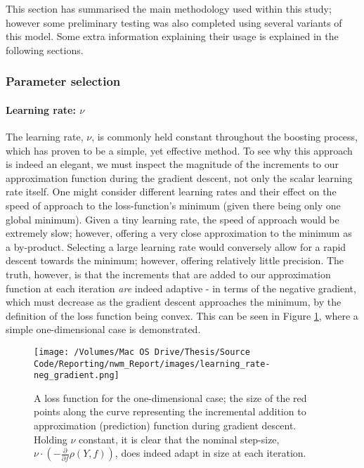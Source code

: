 \documentclass{article}
\begin{document}
This section has summarised the main methodology used within this study; however some preliminary testing was also completed using several variants of this model. Some extra information explaining their usage is explained in the following sections.


\subsubsection{Parameter selection \label{param-selection}}
\label{sec-1-4-2}


\paragraph{Learning rate: $\nu$ \label{nu}}
\label{sec-1-4-2-1}

The learning rate, $\nu$, is commonly held constant throughout the boosting process, which has proven to be a simple, yet effective method. To see why this approach is indeed an elegant, we must inspect the magnitude of the increments to our approximation function during the gradient descent, not only the scalar learning rate itself. One might consider different learning rates and their effect on the speed of approach to the loss-function's minimum (given there being only one global minimum). Given a tiny learning rate, the speed of approach would be extremely slow; however, offering a very close approximation to the minimum as a by-product. Selecting a large learning rate would conversely allow for a rapid descent towards the minimum; however, offering relatively little precision. The truth, however, is that the increments that are added to our approximation function at each iteration \emph{are} indeed adaptive - in terms of the negative gradient, which must decrease as the gradient descent approaches the minimum, by the definition of the loss function being convex. This can be seen in Figure \ref{fig:grad-descent}, where a simple one-dimensional case is demonstrated.

\begin{figure}[htb]
\centering
\texttt{[image: /Volumes/Mac OS Drive/Thesis/Source Code/Reporting/nwm\_Report/images/learning\_rate-neg\_gradient.png]}
\caption[An example loss function for the one-dimensional case]{\label{fig:grad-descent}A loss function for the one-dimensional case; the size of the red points along the curve representing the incremental addition to approximation (prediction) function during gradient descent. Holding $\nu$ constant, it is clear that the nominal step-size, $\nu \cdot \left( - \frac{\partial}{\partial f}\rho (Y, f)\right)$, does indeed adapt in size at each iteration.}
\end{figure}
\end{document}
